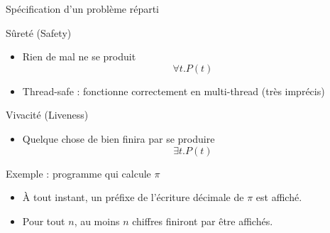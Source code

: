 
\begingroup

\begin{frame}{Spécification d'un problème réparti}
  \begin{block}{Sûreté (Safety)}
    \begin{itemize}
    \item Rien de mal ne se produit
      $$\forall t. P(t)$$
    \item Thread-safe : fonctionne correctement en multi-thread (très imprécis)
    \end{itemize}
  \end{block}
  \begin{block}{Vivacité (Liveness)}
    \begin{itemize}
    \item Quelque chose de bien finira par se produire
      $$\exists t. P(t)$$
    \end{itemize}
  \end{block}
  \begin{exampleblock}{Exemple : programme qui calcule $\pi$}
    \begin{itemize}
    \item[Sûreté :] \alert{À tout instant}, un préfixe
      de l'écriture décimale de $\pi$ est affiché.
    \item[Vivacité :] Pour tout $n$,
      au moins $n$ chiffres \alert{finiront par} être affichés.
    \end{itemize}
  \end{exampleblock}
\end{frame}

\endgroup
\endinput
